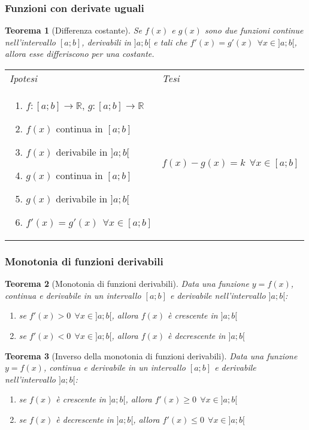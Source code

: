 \documentclass{article}     %
\newcommand\R{\mathbb{R}}
\newtheorem*{theorem}{Teorema}
\newenvironment{shadedTheorem}%
  {\begin{mdframed}[backgroundcolor=lightgray!40, linecolor=white, innertopmargin=4pt, innerbottommargin=13pt]\begin{theorem}}%
  {\end{theorem}\end{mdframed}}
\begin{document}
        \subsubsection{Funzioni con derivate uguali}
            \begin{shadedTheorem}[Differenza costante]
                Se $f(x)$ e $g(x)$ sono due funzioni continue nell'intervallo $[a;b]$, derivabili in $]a;b[$ e tali che $f'(x)=g'(x)~~\forall x \in ]a;b[$, allora esse differiscono per una costante.
            \end{shadedTheorem}
            \begin{tabular}{m{}m{}}
            \textit{Ipotesi} & \textit{Tesi}\\
            \begin{enumerate}
                \item $f:[a;b] \to \R$, $g: [a;b] \to \R$
                \item $f(x)$ continua in $[a;b]$
                \item $f(x)$ derivabile in $]a;b[$
                \item $g(x)$ continua in $[a;b]$
                \item $g(x)$ derivabile in $]a;b[$
                \item $f'(x)=g'(x) ~~ \forall x \in [a;b]$
        \end{enumerate} & $f(x)-g(x) = k ~~ \forall x \in [a;b]$
           \end{tabular}
        \subsubsection{Monotonia di funzioni derivabili}
            \begin{shadedTheorem}[Monotonia di funzioni derivabili]
                Data una funzione $y=f(x)$, continua e derivabile in un intervallo $[a;b]$ e derivabile nell'intervallo $]a;b[$: \begin{enumerate}
                    \item se $f'(x)>0 ~~\forall x \in ]a;b[$, allora $f(x)$ è crescente in $]a;b[$
                    \item se $f'(x)<0 ~~\forall x \in ]a;b[$, allora $f(x)$ è decrescente in $]a;b[$
                \end{enumerate} 
            \end{shadedTheorem}
            \begin{shadedTheorem}[Inverso della monotonia di funzioni derivabili]
                Data una funzione $y=f(x)$, continua e derivabile in un intervallo $[a;b]$ e derivabile nell'intervallo $]a;b[$: \begin{enumerate}
                    \item se $f(x)$ è crescente in $]a;b[$, allora $f'(x)\geq0 ~~\forall x \in ]a;b[$
                    \item se $f(x)$ è decrescente in $]a;b[$, allora $f'(x)\leq0 ~~\forall x \in ]a;b[$
                \end{enumerate} 
            \end{shadedTheorem}
\end{document}
